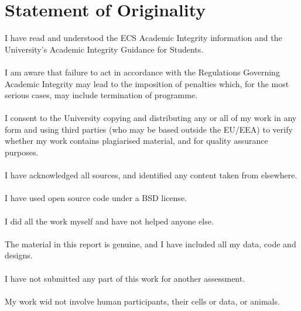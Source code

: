 \chapter*{Statement of Originality}

I have read and understood the ECS Academic Integrity information and the University’s Academic Integrity Guidance for Students.\\
\\
I am aware that failure to act in accordance with the Regulations Governing Academic Integrity may lead to the imposition of penalties which, for the most serious cases, may include termination of programme.\\
\\
I consent to the University copying and distributing any or all of my work in any form and using third parties (who may be based outside the EU/EEA) to verify whether my work contains plagiarised material, and for quality assurance purposes.\\
\\
I have acknowledged all sources, and identified any content taken from elsewhere.\\
\\
I have used open source code under a BSD license.\\
\\
I did all the work myself and have not helped anyone else.\\
\\
The material in this report is genuine, and I have included all my data, code and designs.\\
\\
I have not submitted any part of this work for another assessment.\\
\\
My work wid not involve human participants, their cells or data, or animals.\\
